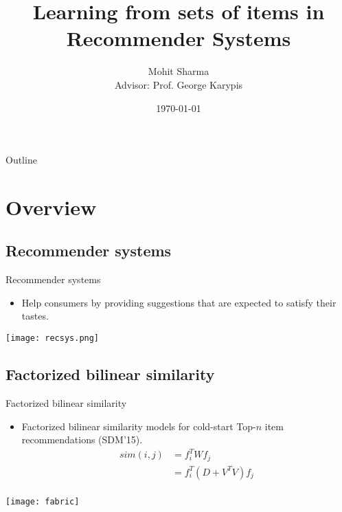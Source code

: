\documentclass[t,xcolor={dvipsnames,usenames}]{beamer}
\title{Learning from sets of items in Recommender Systems}
\author{Mohit Sharma\\Advisor: Prof. George Karypis}
\institute{
  University of Minnesota\\
  \url{mohit@cs.umn.edu}
}
\date{\today}
\newcommand*{\TOPN}{Top-$n$\xspace}
\begin{document}
\begin{frame}
  \titlepage
\end{frame}

\begin{frame}[noframenumbering]{Outline}
   \tableofcontents
\end{frame}

\section{Overview}

\subsection{Recommender systems}
\begin{frame}{Recommender systems}
  \begin{itemize}
    \item Help consumers by providing suggestions that are expected to satisfy
      their tastes.
  \end{itemize}
  \begin{center}
  \texttt{[image: recsys.png]}
\end{center}
\end{frame}

\subsection{Factorized bilinear similarity}
\begin{frame}{Factorized bilinear similarity}
  \begin{itemize}
    \item Factorized bilinear similarity models for cold-start \TOPN item recommendations (SDM'15).
        \begin{equation*}
          \begin{split}
            sim(i,j) &= f_i ^T W f_j \\  
              &= f_i ^T ( D + V^T V) f_j\\
          \end{split}
        \end{equation*}
  \end{itemize}
  \begin{center}
    \texttt{[image: fabric]}
  \end{center}
\end{frame}
\end{document}
